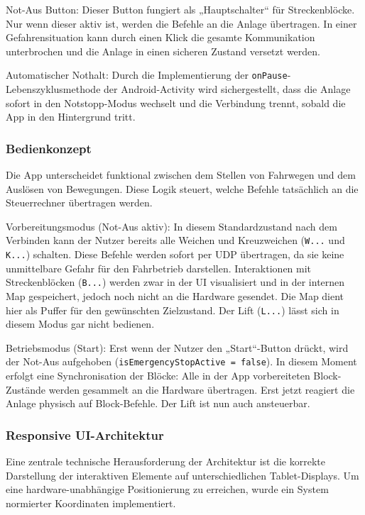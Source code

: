 \documentclass{article}
\begin{document}
Not-Aus Button: Dieser Button fungiert als „Hauptschalter“ für Streckenblöcke.
Nur wenn dieser aktiv ist, werden die Befehle an die Anlage übertragen.
In einer Gefahrensituation kann durch einen Klick die gesamte Kommunikation unterbrochen und die Anlage in einen sicheren Zustand versetzt werden.

Automatischer Nothalt:
Durch die Implementierung der \texttt{onPause}-Lebenszyklusmethode der Android-Activity wird sichergestellt, dass die Anlage sofort in den Notstopp-Modus wechselt und die Verbindung trennt, sobald die App in den Hintergrund tritt.


\subsubsection{Bedienkonzept}
Die App unterscheidet funktional zwischen dem Stellen von Fahrwegen und dem Auslösen von Bewegungen.
Diese Logik steuert, welche Befehle tatsächlich an die Steuerrechner übertragen werden.

Vorbereitungsmodus (Not-Aus aktiv):
In diesem Standardzustand nach dem Verbinden kann der Nutzer bereits alle Weichen und Kreuzweichen (\texttt{W...} und \texttt{K...}) schalten.
Diese Befehle werden sofort per UDP übertragen, da sie keine unmittelbare Gefahr für den Fahrbetrieb darstellen.
Interaktionen mit Streckenblöcken (\texttt{B...}) werden zwar in der UI visualisiert und in der internen Map gespeichert, jedoch noch nicht an die Hardware gesendet.
Die Map dient hier als Puffer für den gewünschten Zielzustand. Der Lift (\texttt{L...}) lässt sich in diesem Modus gar nicht bedienen.

Betriebsmodus (Start):
Erst wenn der Nutzer den „Start“-Button drückt, wird der Not-Aus aufgehoben (\texttt{isEmergencyStopActive = false}).
In diesem Moment erfolgt eine Synchronisation der Blöcke: Alle in der App vorbereiteten Block-Zustände werden gesammelt an die Hardware übertragen.
Erst jetzt reagiert die Anlage physisch auf Block-Befehle. Der Lift ist nun auch ansteuerbar.


\subsubsection{Responsive UI-Architektur}
Eine zentrale technische Herausforderung der Architektur ist die korrekte Darstellung der interaktiven Elemente auf unterschiedlichen Tablet-Displays.
Um eine hardware-unabhängige Positionierung zu erreichen, wurde ein System normierter Koordinaten implementiert.
\end{document}
